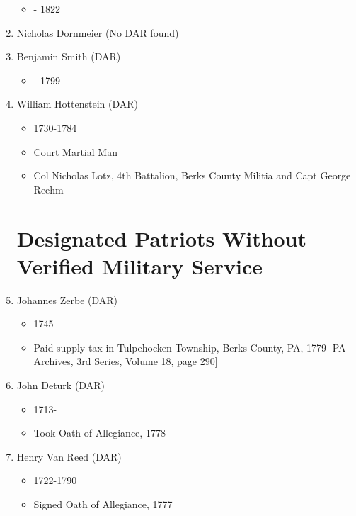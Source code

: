 \documentclass[11pt,letter]{book}
\begin{document}
\begin{enumerate}
\begin{itemize}
\item - 1822
\end{itemize}
\item Nicholas Dornmeier (No DAR found)
\item Benjamin Smith (DAR)
\begin{itemize}
\item - 1799
\end{itemize}
\item William Hottenstein (DAR)
\begin{itemize}
\item 1730-1784
\item Court Martial Man
\item Col Nicholas Lotz, 4th Battalion, Berks County Militia and Capt George Reehm
\end{itemize}

\section{Designated Patriots Without Verified Military Service}

\item Johannes Zerbe (DAR)
\begin{itemize}
\item 1745-
\item Paid supply tax in Tulpehocken Township, Berks County, PA, 1779 [PA Archives, 3rd Series, Volume 18, page 290]
\end{itemize}
\item John Deturk (DAR)
\begin{itemize}
\item 1713-
\item Took Oath of Allegiance, 1778
\end{itemize}
\item Henry Van Reed (DAR)
\begin{itemize}
\item 1722-1790
\item Signed Oath of Allegiance, 1777
\end{itemize}
\end{enumerate}
\end{document}
